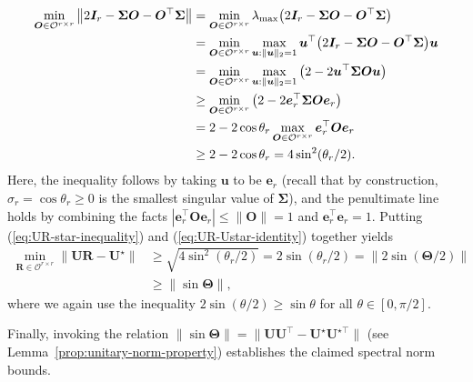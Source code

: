 %
\begin{align}
\min_{\bm{O}\in\mathcal{O}^{r\times r}}\big\|2\bm{I}_{r}-\bm{\Sigma}\bm{O}-\bm{O}^{\top}\bm{\Sigma}\big\|
	& = \min_{\bm{O}\in\mathcal{O}^{r\times r}}\lambda_{\max} \big( 2\bm{I}_{r}-\bm{\Sigma}\bm{O}-\bm{O}^{\top}\bm{\Sigma}\big) \notag\\
	& =\min_{\bm{O}\in\mathcal{O}^{r\times r}}\max_{\bm{u}:\|\bm{u}\|_{2}=1}\bm{u}^{\top}\big(2\bm{I}_{r}-\bm{\Sigma}\bm{O}-\bm{O}^{\top}\bm{\Sigma}\big)\bm{u}\nonumber \\
 & =\min_{\bm{O}\in\mathcal{O}^{r\times r}}\max_{\bm{u}:\|\bm{u}\|_{2}=1}\big(2-2\bm{u}^{\top}\bm{\Sigma}\bm{O}\bm{u}\big)\nonumber \\
 & \geq\min_{\bm{O}\in\mathcal{O}^{r\times r}}\big(2-2\bm{e}_{r}^{\top}\bm{\Sigma}\bm{O}\bm{e}_{r}\big)\nonumber \\
 & = 2-2\cos\theta_{r}\max_{\bm{O}\in\mathcal{O}^{r\times r}}\bm{e}_{r}^{\top}\bm{O}\bm{e}_{r}\nonumber \\
 & \geq 2-2\cos\theta_{r}
	=4\sin^{2}(\theta_{r}/2).\label{eq:UR-star-inequality}
\end{align}
%
Here, the inequality follows by taking $\bm{u}$ to be $\bm{e}_{r}$
(recall that by construction, $\sigma_{r}=\cos\theta_{r}\geq 0$ is the
smallest singular value of $\bm{\Sigma}$), and the penultimate line
holds by combining the facts $|\bm{e}_{r}^{\top}\bm{O}\bm{e}_{r}|\leq\|\bm{O}\|=1$
and $\bm{e}_{r}^{\top}\bm{e}_{r}=1$. Putting (\ref{eq:UR-star-inequality})
and (\ref{eq:UR-Ustar-identity}) together yields
%
\begin{align*}
\min_{\bm{R}\in\mathcal{O}^{r\times r}}\big\|\bm{U}\bm{R}-\bm{U}^{\star}\big\| & \geq\sqrt{4\sin^{2}(\theta_{r}/2)}=2\sin(\theta_{r}/2)=\|2\sin(\bm{\Theta}/2)\|\nonumber \\
 & \geq\|\sin\bm{\Theta}\|,
\end{align*}
%
where we again use the inequality $2\sin(\theta/2) \geq \sin \theta$ for all $\theta\in [0,\pi/2]$.

Finally, invoking the relation $\|\sin\bm{\Theta}\|=  \|\bm{U}\bm{U}^{\top} - \bm{U}^{\star}\bm{U}^{\star\top}\|$ (see Lemma~\ref{prop:unitary-norm-property}) establishes the claimed spectral norm bounds.





